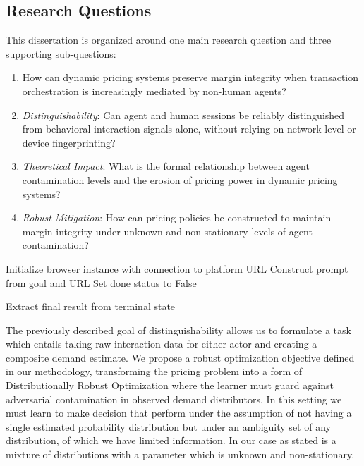 \subsection{Research Questions}

This dissertation is organized around one main research question and three supporting sub-questions:
\begin{enumerate}
    \item[\textbf{Main RQ}] How can dynamic pricing systems preserve margin integrity when transaction orchestration is increasingly mediated by non-human agents?
    \item[\textbf{SQ1}] \textit{Distinguishability}: Can agent and human sessions be reliably distinguished from behavioral interaction signals alone, without relying on network-level or device fingerprinting?
    \item[\textbf{SQ2}] \textit{Theoretical Impact}: What is the formal relationship between agent contamination levels and the erosion of pricing power in dynamic pricing systems?
    \item[\textbf{SQ3}] \textit{Robust Mitigation}: How can pricing policies be constructed to maintain margin integrity under unknown and non-stationary levels of agent contamination?
\end{enumerate}


\begin{algorithm}[t]
\DontPrintSemicolon



Initialize browser instance with connection to platform URL\;
Construct prompt from goal and URL\;
Set done status to False\;


Extract final result from terminal state\;
\;

\caption{AI Agent's Interaction Loop}
\label{algagent-loop}
\end{algorithm}


The previously described goal of distinguishability allows us to formulate a task which entails taking raw interaction data for either actor and creating a composite demand estimate. We propose a robust optimization objective defined in our methodology, transforming the pricing problem into a form of Distributionally Robust Optimization \parencite{kuhn_distributionally_2025} where the learner must guard against adversarial contamination in observed demand distributors. In this setting we must learn to make decision that perform under the assumption of not having a single estimated probability distribution but under an ambiguity set of any distribution, of which we have limited information. In our case as stated is a mixture of distributions with a parameter which is unknown and non-stationary.
